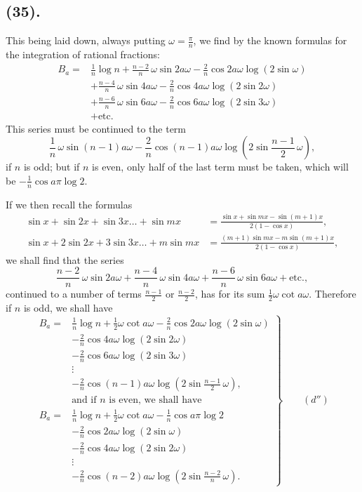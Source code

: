 \documentclass{article}
\begin{document}
\subsection*{(35).}

This being laid down, always putting $\omega=\frac{\pi}{n}$, we find by the known formulas for the integration of rational fractions:
\[ \begin{aligned} B_{a}={}&\frac{1}{n}\log n+\frac{n-2}{n}\,\omega\sin 2a\omega-\frac{2}{n}\cos 2a\omega\log(2\sin\omega)\\ &+\frac{n-4}{n}\,\omega\sin 4a\omega-\frac{2}{n}\cos 4a\omega\log(2\sin 2\omega)\\ &+\frac{n-6}{n}\,\omega\sin 6a\omega-\frac{2}{n}\cos 6a\omega\log(2\sin 3\omega)\\ &+\text{etc.} \end{aligned} \]
This series must be continued to the term
\[ \frac{1}{n}\,\omega\sin(n-1)a\omega-\frac{2}{n}\cos(n-1)a\omega\log\left(2\sin\frac{n-1}{2}\,\omega\right), \]
if $n$ is odd; but if $n$ is even, only half of the last term must be taken, which will be $-\frac{1}{n}\cos a\pi\log 2$.


If we then recall the formulas
\[ \begin{aligned} \sin x+\sin 2x+\sin 3x\ldots+\sin mx&=\frac{\sin x+\sin mx-\sin(m+1)x}{2(1-\cos x)},\\ \sin x+2\sin 2x+3\sin 3x\ldots+m\sin mx&=\frac{(m+1)\sin mx-m\sin(m+1)x}{2(1-\cos x)}, \end{aligned} \]
we shall find that the series
\[ \frac{n-2}{n}\,\omega\sin 2a\omega+\frac{n-4}{n}\,\omega\sin 4a\omega+\frac{n-6}{n}\,\omega\sin 6a\omega+\text{etc.}, \]
continued to a number of terms $\frac{n-1}{2}$ or $\frac{n-2}{2}$, has for its sum $\frac{1}{2}\omega\cot a\omega$. Therefore if $n$ is odd, we shall have
\[ \left.\begin{aligned} B_{a}={}&\frac{1}{n}\log n+\tfrac{1}{2}\omega\cot a\omega-\frac{2}{n}\cos 2a\omega\log(2\sin\omega)\\ &-\frac{2}{n}\cos 4a\omega\log(2\sin 2\omega)\\ &-\frac{2}{n}\cos 6a\omega\log(2\sin 3\omega)\\ &\vdots\\ &-\frac{2}{n}\cos(n-1)a\omega\log\left(2\sin\frac{n-1}{2}\,\omega\right),\\ &\text{and if } n \text{ is even, we shall have}\\ B_{a}={}&\frac{1}{n}\log n+\tfrac{1}{2}\omega\cot a\omega-\frac{1}{n}\cos a\pi\log 2\\ &-\frac{2}{n}\cos 2a\omega\log(2\sin\omega)\\ &-\frac{2}{n}\cos 4a\omega\log(2\sin 2\omega)\\ &\vdots\\ &-\frac{2}{n}\cos(n-2)a\omega\log\left(2\sin\frac{n-2}{n}\,\omega\right). \end{aligned}\right\}\qquad(d'') \]
\end{document}
